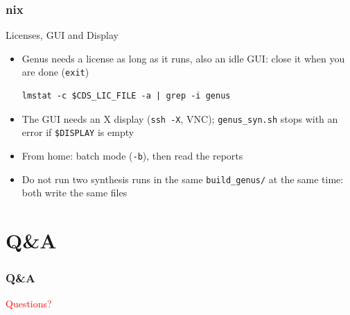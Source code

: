 \documentclass{beamer}
\newcommand{\astitle}{nix}
\newcommand{\assubtitle}{nix}
\newcommand{\cmd}[1]{\texttt{#1}}
\begin{document}
\renewcommand{\assubtitle}{Licenses, GUI and Display}
\begin{frame}[fragile]
\frametitle{\astitle}
\begin{block}{\assubtitle}
  \begin{itemize}
    \item Genus needs a license as long as it runs, also an idle GUI:
      close it when you are done (\cmd{exit})
\begin{lstlisting}[style=sh]
lmstat -c $CDS_LIC_FILE -a | grep -i genus
\end{lstlisting}
    \item The GUI needs an X display (\cmd{ssh -X}, VNC);
      \cmd{genus\_syn.sh} stops with an error if \cmd{\$DISPLAY} is empty
    \item From home: batch mode (\cmd{-b}), then read the reports
    \item Do not run two synthesis runs in the same \cmd{build\_genus/}
      at the same time: both write the same files
  \end{itemize}
\end{block}
\end{frame}

\section{Q\&A}
\renewcommand{\astitle}{Q\&A}
\begin{frame}
\frametitle{\astitle}
\vfill
\centering
\begin{Huge}\textcolor{red}{Questions?}\end{Huge}
\vfill
\end{frame}
\end{document}
